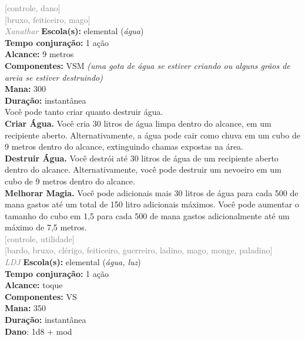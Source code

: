\documentclass{RPG_Adventure}[2021/10/20]
\begin{document}
{\scriptsize \textcolor{gray}{[controle, dano]\\}}
{\scriptsize \textcolor{gray}{[bruxo, feiticeiro, mago]\\}}
{\tiny \textcolor{gray}{\textit{Xanathar}}}
{\small \t \textbf{Escola(s):} elemental (\textit{água})\\\t \textbf{Tempo conjuração:} 1 ação\\\t \textbf{Alcance:} 9 metros\\\t \textbf{Componentes:} VSM \textit{(uma gota de água se estiver criando ou alguns grãos de areia se estiver destruindo)}\\\t \textbf{Mana:} 300\\\t \textbf{Duração:} instantânea\\}
{\normalsize Você pode tanto criar quanto destruir água.\\\t \textbf{Criar Água.} Você cria 30 litros de água limpa dentro do alcance, em um recipiente aberto. Alternativamente, a água pode cair como chuva em um cubo de 9 metros dentro do alcance, extinguindo chamas expostas na área.\\\t \textbf{Destruir Água.} Você destrói até 30 litros de água de um recipiente aberto dentro do alcance. Alternativamente, você pode destruir um nevoeiro em um cubo de 9 metros dentro do alcance.\\\t \textbf{Melhorar Magia.} Você pode adicionais mais 30 litros de água para cada 500 de mana gastos até um total de 150 litro adicionais máximos. Você pode aumentar o tamanho do cubo em 1,5 para cada 500 de mana gastos adicionalmente até um máximo de 7,5 metros.\\}
{\scriptsize \textcolor{gray}{[controle, utilidade]\\}}
{\scriptsize \textcolor{gray}{[bardo, bruxo, clérigo, feiticeiro, guerreiro, ladino, mago, monge, paladino]\\}}
{\tiny \textcolor{gray}{\textit{LDJ}}}
{\small \t \textbf{Escola(s):} elemental (\textit{água, luz})\\\t \textbf{Tempo conjuração:} 1 ação\\\t \textbf{Alcance:} toque\\\t \textbf{Componentes:} VS\\\t \textbf{Mana:} 350\\\t \textbf{Duração:} instantânea\\\t \textbf{Dano}: 1d8 + mod\\}
\end{document}
